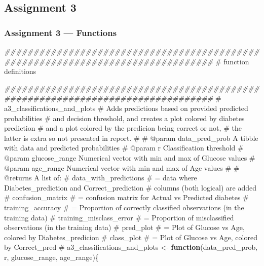 \documentclass[
  english,
  11pt,
]{article}
\newenvironment{Shaded}{\begin{snugshade}}{\end{snugshade}}
\newcommand{\CommentTok}[1]{\textcolor[rgb]{0.37,0.37,0.37}{#1}}
\newcommand{\ControlFlowTok}[1]{\textcolor[rgb]{0.00,0.23,0.31}{\textbf{#1}}}
\newcommand{\DocumentationTok}[1]{\textcolor[rgb]{0.37,0.37,0.37}{\textit{#1}}}
\newcommand{\NormalTok}[1]{\textcolor[rgb]{0.00,0.23,0.31}{#1}}
\newcommand{\OtherTok}[1]{\textcolor[rgb]{0.00,0.23,0.31}{#1}}
\begin{document}
\subsection{Assignment 3}\label{assignment-3}

\subsubsection{Assignment 3 --- Functions}\label{assignment-3-functions}

\begin{Shaded}
\begin{Highlighting}[]
\DocumentationTok{\#\#\#\#\#\#\#\#\#\#\#\#\#\#\#\#\#\#\#\#\#\#\#\#\#\#\#\#\#\#\#\#\#\#\#\#\#\#\#\#\#\#\#\#\#\#\#\#\#\#\#\#\#\#\#\#\#\#\#\#\#\#\#\#\#\#\#\#\#\#\#\#\#\#\#\#\#\#\#\#}
\CommentTok{\# function definitions}

\DocumentationTok{\#\#\#\#\#\#\#\#\#\#\#\#\#\#\#\#\#\#\#\#\#\#\#\#\#\#\#\#\#\#\#\#\#\#\#\#\#\#\#\#\#\#\#\#\#\#\#\#\#\#\#\#\#\#\#\#\#\#\#\#\#\#\#\#\#\#\#\#\#\#\#\#\#\#\#\#\#\#\#\#}
\CommentTok{\#\textquotesingle{} a3\_classifications\_and\_plots}
\CommentTok{\#\textquotesingle{} Adds predictions based on provided predicted probabilities}
\CommentTok{\#\textquotesingle{} and decision threshold, and creates a plot colored by diabetes prediction}
\CommentTok{\#\textquotesingle{} and a plot colored by the predicion being correct or not,}
\CommentTok{\#\textquotesingle{} the latter is extra so not presented in report.}
\CommentTok{\#\textquotesingle{}}
\CommentTok{\#\textquotesingle{} @param data\_pred\_prob A tibble with data and predicted probabilities}
\CommentTok{\#\textquotesingle{} @param r Classification threshold}
\CommentTok{\#\textquotesingle{} @param glucose\_range Numerical vector with min and max of Glucose values}
\CommentTok{\#\textquotesingle{} @param age\_range Numerical vector with min and max of Age values}
\CommentTok{\#\textquotesingle{}}
\CommentTok{\#\textquotesingle{} @returns A list of:}
\CommentTok{\#\textquotesingle{} data\_with\_predictions}
\CommentTok{\#\textquotesingle{}    = data where Diabetes\_prediction and Correct\_prediction}
\CommentTok{\#\textquotesingle{}    columns (both logical) are added}
\CommentTok{\#\textquotesingle{} confusion\_matrix}
\CommentTok{\#\textquotesingle{}    = confusion matrix for Actual vs Predicted diabetes}
\CommentTok{\#\textquotesingle{} training\_accuracy}
\CommentTok{\#\textquotesingle{}    = Proportion of correctly classified observations (in the training data)}
\CommentTok{\#\textquotesingle{} training\_misclass\_error}
\CommentTok{\#\textquotesingle{}    = Proportion of misclassified observations (in the training data)}
\CommentTok{\#\textquotesingle{} pred\_plot}
\CommentTok{\#\textquotesingle{}    = Plot of Glucose vs Age, colored by Diabetes\_predicion}
\CommentTok{\#\textquotesingle{} class\_plot}
\CommentTok{\#\textquotesingle{}    = Plot of Glucose vs Age, colored by Correct\_pred}
\CommentTok{\#\textquotesingle{}}
\NormalTok{a3\_classifications\_and\_plots }\OtherTok{\textless{}{-}}
  \ControlFlowTok{function}\NormalTok{(data\_pred\_prob, r, glucose\_range, age\_range)\{}


\end{Highlighting}
\end{Shaded}
\end{document}
